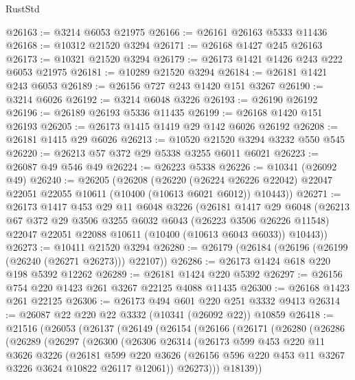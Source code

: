 \begin{lexlean}{RustStd}
\begin{coremodule}
@26163 := @3214 @6053 @21975
@26166 := @26161 @26163 @5333 @11436
@26168 := @10312 @21520 @3294
@26171 := @26168 @1427 @245 @26163
@26173 := @10321 @21520 @3294
@26179 := @26173 @1421 @1426 @243 @222 @6053 @21975
@26181 := @10289 @21520 @3294
@26184 := @26181 @1421 @243 @6053
@26189 := @26156 @727 @243 @1420 @151 @3267
@26190 := @3214 @6026
@26192 := @3214 @6048 @3226
@26193 := @26190 @26192
@26196 := @26189 @26193 @5336 @11435
@26199 := @26168 @1420 @151 @26193
@26205 := @26173 @1415 @1419 @29 @142 @6026 @26192
@26208 := @26181 @1415 @29 @6026
@26213 := @10520 @21520 @3294 @3232 @550 @545
@26220 := @26213 @57 @372 @29 @5338 @3255 @6011 @6021
@26223 := @26087 @49 @546 @49
@26224 := @26223 @5338
@26226 := @10341 (@26092 @49)
@26240 := @26205
    (@26208
      (@26220
        (@26224 @26226 @22042)
        @22047
        @22051
        @22055
        @10611
        (@10400 (@10613 @6021 @6012))
        @10443))
@26271 := @26173
    @1417
    @453
    @29
    @11
    @6048
    @3226
    (@26181
      @1417
      @29
      @6048
      (@26213
        @67
        @372
        @29
        @3506
        @3255
        @6032
        @6043
        (@26223 @3506 @26226 @11548)
        @22047
        @22051
        @22088
        @10611
        (@10400 (@10613 @6043 @6033))
        @10443))
@26273 := @10411 @21520 @3294
@26280 := @26179 (@26184 (@26196 (@26199 (@26240 (@26271 @26273))) @22107))
@26286 := @26173 @1424 @618 @220 @198 @5392 @12262
@26289 := @26181 @1424 @220 @5392
@26297 := @26156 @754 @220 @1423 @261 @3267 @22125 @4088 @11435
@26300 := @26168 @1423 @261 @22125
@26306 := @26173 @494 @601 @220 @251 @3332 @9413
@26314 := @26087 @22 @220 @22 @3332 (@10341 (@26092 @22)) @10859
@26418 := @21516
    (@26053
      (@26137
        (@26149
          (@26154
            (@26166
              (@26171
                (@26280
                  (@26286
                    (@26289
                      (@26297
                        (@26300
                          (@26306
                            @26314
                            (@26173
                              @599
                              @453
                              @220
                              @11
                              @3626
                              @3226
                              (@26181
                                @599
                                @220
                                @3626
                                (@26156 @596 @220 @453 @11 @3267 @3226 @3624 @10822 @26117 @12061))
                              @26273)))
                        @18139))

\end{coremodule}
\end{lexlean}
